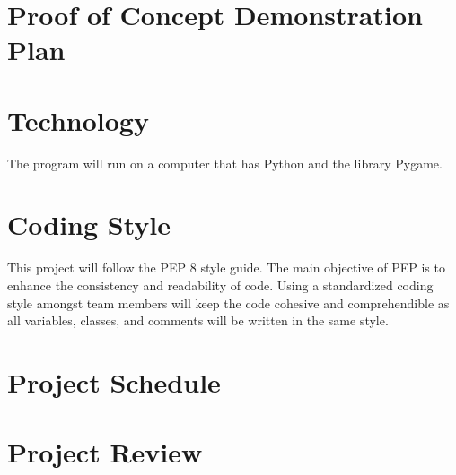 \documentclass{article}
\begin{document}
	
	\section{Proof of Concept Demonstration Plan}
	
	\section{Technology}
	The program will run on a computer that has Python and the library Pygame. 
	
	\section{Coding Style}
	This project will follow the PEP 8 style guide. The main objective of PEP is to enhance the consistency and readability of code. Using a standardized coding style amongst team members will keep the code cohesive and comprehendible as all variables, classes, and comments will be written in the same style. 
	
	\section{Project Schedule}

	
	
	\section{Project Review}
	
\end{document}
